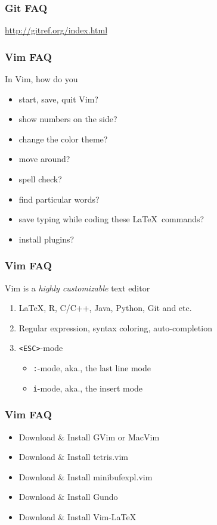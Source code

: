 \documentclass[hyperref={colorlinks=false},handout,10pt]{beamer}
\let\olditem\item
\renewcommand{\item}{\setlength{\itemsep}{0.5\baselineskip}\olditem}
\begin{document}
\begin{frame}
    \frametitle{Git FAQ}
    \begin{center}
        \href{http://gitref.org/index.html}{http://gitref.org/index.html}
    \end{center}
\end{frame}

\begin{frame}
    \frametitle{Vim FAQ}
    In Vim, how do you
    \begin{itemize}
        \item start, save, quit Vim? 
        \item show numbers on the side?
        \item change the color theme?
        \item move around?
        \item spell check?
        \item find particular words?
        \item save typing while coding these \LaTeX\ commands?
        \item install plugins?
    \end{itemize}
\end{frame}

\begin{frame}
    \frametitle{Vim FAQ}
    \begin{block}
        {Vim is a \emph{highly customizable} text editor}
    \vskip0.1in
    \begin{enumerate}
        \item \LaTeX, R, C/C++, Java, Python, Git and etc.
        \item Regular expression, syntax coloring, auto-completion
        \item \texttt{<ESC>}-mode
        \begin{itemize}
            \item \texttt{:}-mode, aka., the last line mode
            \item \texttt{i}-mode, aka., the insert mode
        \end{itemize}
    \end{enumerate}
    \end{block}
\end{frame}

\begin{frame}
    \frametitle{Vim FAQ}
    \begin{itemize}
        \item Download \& Install GVim or MacVim
        \item Download \& Install tetris.vim
        \item Download \& Install minibufexpl.vim
        \item Download \& Install Gundo 
        \item Download \& Install Vim-LaTeX
    \end{itemize}
\end{frame}
\end{document}
